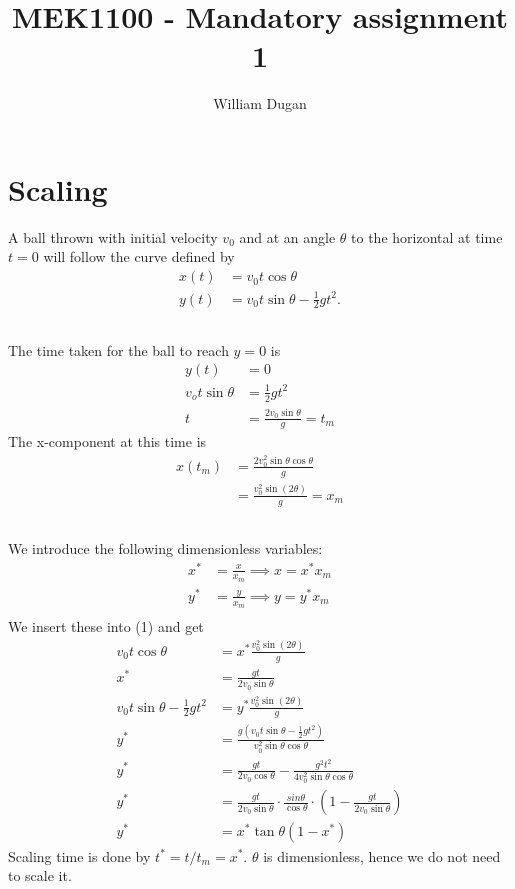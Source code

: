 \documentclass[a4paper,10pt,english]{article}
\title{MEK1100 - Mandatory assignment 1}
\author{William Dugan}
\begin{document}
\maketitle

\section{Scaling}
A ball thrown with initial velocity $v_0$ and at an angle $\theta$ to the horizontal at time $t=0$ will follow the curve defined by
\begin{align}
    x(t) &= v_0 t \cos\theta \\
    y(t) &= v_0 t \sin\theta - \frac{1}{2} g t^2.
    \label{eq:1}
\end{align}

\subsection{}
The time taken for the ball to reach $y=0$ is
\begin{align*}
    y(t) &= 0 \\
    v_o t \sin\theta &= \frac{1}{2} g t^2 \\
    t &= \frac{2 v_0 \sin\theta}{g} = t_m
\end{align*}
The x-component at this time is
\begin{align*}
    x(t_m) &= \frac{2 v_0^2 \sin\theta\cos\theta}{g} \\
    &= \frac{v_0^2\sin(2\theta)}{g} = x_m
\end{align*}

\subsection{}
We introduce the following dimensionless variables:
\begin{align*}
    x^* &= \frac{x}{x_m} \implies x = x^* x_m \\
    y^* &= \frac{y}{x_m} \implies y = y^* x_m \\
\end{align*}
We insert these into (1) and get
\begin{align*}
    v_0 t \cos\theta &= x^* \frac{v_0^2 \sin(2\theta)}{g} \\
    x^* &= \frac{gt}{2 v_0 \sin\theta} \\
    v_0 t \sin\theta - \frac{1}{2} g t^2 &= y^* \frac{v_0^2 \sin(2\theta)}{g} \\
    y^* &= \frac{g(v_0 t \sin\theta - \frac{1}{2}gt^2)}{v_0^2 \sin\theta\cos\theta} \\
    y^* &= \frac{gt}{2v_0\cos\theta} - \frac{g^2t^2}{4v_0^2 \sin\theta\cos\theta} \\
    y^* &= \frac{gt}{2v_0\sin\theta} \cdot \frac{sin\theta}{\cos\theta} \cdot \left(1-\frac{gt}{2v_0\sin\theta}\right) \\
    y^* &= x^* \tan\theta (1-x^*)
\end{align*}
Scaling time is done by $t^* = t/t_m = x^*$. $\theta$ is dimensionless, hence we do not need to scale it. 
\end{document}
